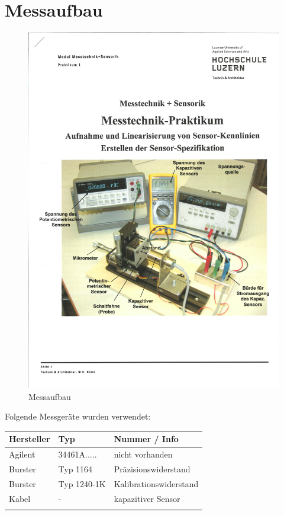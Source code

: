 \section{Messaufbau}


\begin{figure}[H]
    \centering
    \includegraphics[scale=0.8,trim={0.5cm 6cm 0 10.5cm},clip]{pic/aufbau.pdf}
    \caption{Messaufbau}
    \label{fig:messaufbau}
\end{figure}

Folgende Messgeräte wurden verwendet: \\

\begin{tabular}{ l | l | l}
    \hline
    Hersteller & Typ         & Nummer / Info          \\ \hline
    Agilent    & 34461A..... & nicht vorhanden   \\ \hline
    Burster    & Typ 1164    & Präzisionswiderstand      \\ \hline
    Burster    & Typ 1240-1K & Kalibrationswiderstand \\ \hline
    Kabel    &    -    & kapazitiver Sensor          \\ \hline
    \\ \hline
\end{tabular}








\clearpage